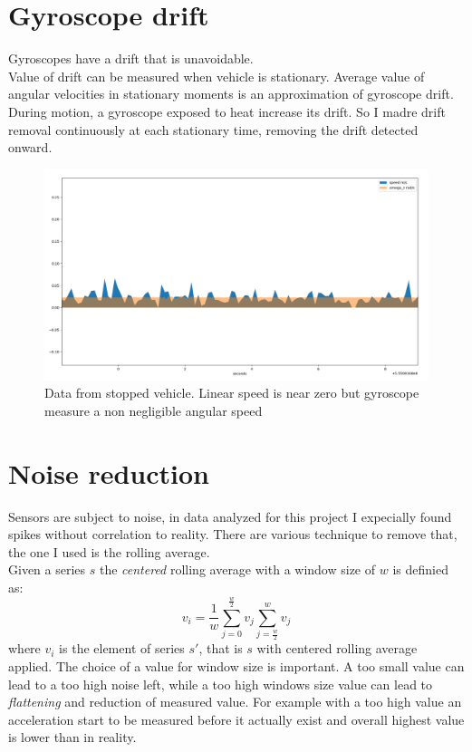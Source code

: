 \section{Gyroscope drift}
Gyroscopes have a drift that is unavoidable. \cite{6727722} \\
Value of drift can be measured when vehicle is stationary. Average value of angular velocities in stationary moments is an approximation of gyroscope drift.
During motion, a gyroscope exposed to heat increase its drift. So I madre drift removal continuously at each stationary time, removing the drift detected onward. 
\begin{figure}[H]
\includegraphics[width=\textwidth]{gyro_drift.png}
\caption{Data from stopped vehicle. Linear speed is near zero but gyroscope measure a non negligible angular speed}
\end{figure}

\section{Noise reduction}
Sensors are subject to noise, in data analyzed for this project I expecially found spikes without correlation to reality.
There are various technique to remove that, the one I used is the rolling average. \\
Given a series $s$ the \textit{centered} rolling average with a window size of $w$ is definied as:
$$ v_i = \frac{1}{w} \sum_{j=0}^{\frac{w}{2}}v_j \sum_{j=\frac{w}{2}}^{w}v_j $$
where $v_i$ is the element of series $s'$, that is $s$ with centered rolling average applied.
The choice of a value for window size is important. A too small value can lead to a too high noise left, while a too high windows size value can lead to \textit{flattening} and reduction of measured value. For example with a too high value an acceleration start to be measured before it actually exist and overall highest value is lower than in reality.

